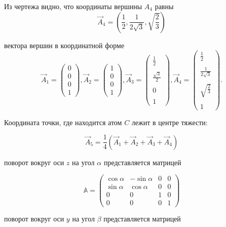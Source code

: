 Из чертежа %
видно, что координаты вершины $A_4$ равны
$$
\vec{A}_4 = \left({\displaystyle \frac{1}{2}}, {\displaystyle \frac{1}{2\sqrt{3}} }, {\displaystyle \sqrt{\frac{2}{3}}}\right)
$$

вектора вершин в координатной форме
$$ 
\vec{A}_1=\left(\begin{array}{c}0\\0\\0\\1\end{array}\right), 
\vec{A}_2 =\left(\begin{array}{c}1\\0\\0\\1\end{array}\right),
\vec{A}_3 =\left(\begin{array}{c}{\displaystyle \frac{1}{2}}\\ \\
{\displaystyle \frac{\sqrt{3}}{2}}\\ \\0\\ \\1\end{array}\right),
\vec{A}_4 =\left(\begin{array}{c}{\displaystyle \frac{1}{2}}\\ \\
{\displaystyle \frac{1}{2\sqrt{3}}}\\ \\
{\displaystyle \sqrt{\frac{2}{3}}}\\ \\1\end{array}\right).
$$ 

Координата точки, где находится атом $C$ лежит в центре тяжести:

$$
\vec{A}_5 = \frac{1}{4}
\left(\vec{A}_1 + \vec{A}_2 + \vec{A}_3 + \vec{A}_4\right)
$$

поворот вокруг оси $z$ на угол $\alpha$ представляется матрицей

$$
\mathds{A} = \left(\begin{array}{cccc}
\cos{\alpha}&-\sin{\alpha}&0&0\\
\sin{\alpha}&\cos{\alpha}&0&0\\
0&0&1&0\\
0&0&0&1
\end{array}\right)
$$

поворот вокруг оси $y$ на угол $\beta$ представляется матрицей

